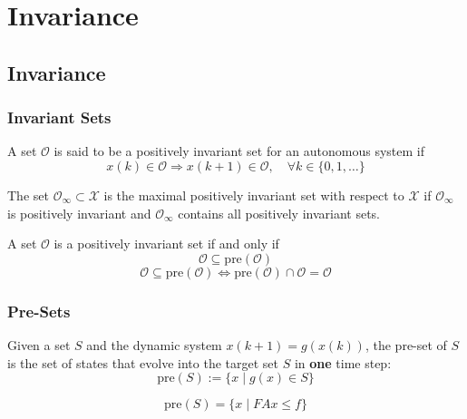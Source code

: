 \section{Invariance}
\subsection{Invariance}
\subsubsection{Invariant Sets}

A set $\mathcal{O}$ is said to be a positively invariant set for an autonomous system if
\begin{equation*}
    x(k) \in \mathcal{O} \Rightarrow x(k + 1) \in \mathcal{O}, \quad \forall k \in \{0, 1, \dots \}
\end{equation*}

\newpar{}

The set $\mathcal{O}_\infty \subset \mathcal{X}$ is the maximal positively invariant set with respect to $\mathcal{X}$ if $\mathcal{O}_\infty$ is positively invariant and $\mathcal{O}_\infty$ contains all positively invariant sets.

\newpar{}

A set $\mathcal{O}$ is a positively invariant set if and only if
\begin{equation*}
    \mathcal{O} \subseteq \text{pre}(\mathcal{O})
\end{equation*}
\begin{equation*}
    \mathcal{O} \subseteq \text{pre}(\mathcal{O}) \iff \text{pre}(\mathcal{O})\cap \mathcal{O} = \mathcal{O}
\end{equation*}

\subsubsection{Pre-Sets}

Given a set $S$ and the dynamic system $x(k + 1) = g(x(k))$, the pre-set of $S$ is the set of states that evolve into the target set $S$ in \textbf{one} time step:
\begin{equation*}
    \text{pre}(S) := \{x \mid g(x) \in S \}
\end{equation*}

\begin{equation*}
    \text{pre}(S) = \{x \mid F A x \leq f \}
\end{equation*}

